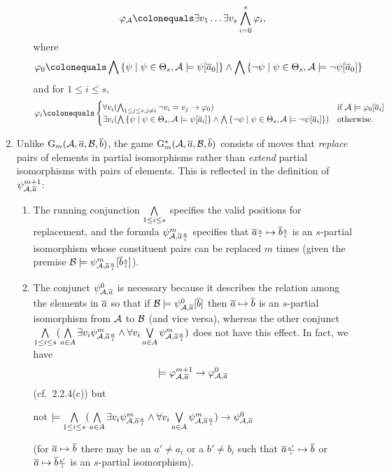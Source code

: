 \begin{enumerate}[1.]
\begin{enumerate}[(a)]
\[
\varphi_\strct{A} \defas \exists v_1 \etc \exists v_s \bland^s_{i = 0} \varphi_i,
\]
where
\[
\varphi_0 \defas \bland \setm{\psi}{\psi \in \Theta_s, \strct{A} \satis \psi[\vect{a}_0]} \land \bland \setm{\neg\psi}{\psi \in \Theta_s, \strct{A} \satis \neg\psi[\vect{a}_0]}
\]
and for $1 \leq i \leq s$,
\[
\varphi_i \defas
\begin{cases}
\forall v_i (\bland_{1 \leq j \leq s, j \neq i} \neg v_i = v_j \lthen \varphi_0) & \text{if \mathmode{\strct{A} \satis \varphi_0[\vect{a}_i]}}\cr
\exists v_i (\bland \setm{\psi}{\psi \in \Theta_s, \strct{A} \satis \psi[\vect{a}_i]} \land \bland \setm{\neg\psi}{\psi \in \Theta_s, \strct{A} \satis \neg\psi[\vect{a}_i]}) & \text{otherwise}.\cr
\end{cases}
\]
\end{enumerate}
%
\item {} Unlike $\game{m}(\strct{A}, \vect{a}, \strct{B}, \vect{b})$, the game $\game[s]{m}(\strct{A}, \vect{a}, \strct{B}, \vect{b})$ consists of moves that \emph{replace} pairs of elements in partial isomorphisms rather than \emph{extend} partial isomorphisms with pairs of elements. This is reflected in the definition of $\ityp{m + 1}{\strct{A}, \vect{a}}$:
\begin{enumerate}[(1)]
\item The running conjunction $\bigwedge\limits_{1 \leq i \leq s}$ specifies the valid positions for replacement, and the formula $\ityp{m}{\strct{A}, \vect{a}\sbst{a}{i}}$ specifies that $\overline{a}{\scriptstyle\frac{a}{i}} \mapsto \overline{b}{\scriptstyle\frac{b}{i}}$ is an $s$-partial isomorphism whose constituent pairs can be replaced $m$ times (given the premise $\strct{B} \satis \ityp{m}{\strct{A}, \vect{a}\sbst{a}{i}}[\vect{b}\sbst{b}{i}]$).
\item The conjunct $\ityp{0}{\strct{A}, \vect{a}}$ is necessary because it describes the relation among the elements in $\overline{a}$ so that if $\strct{B} \satis \ityp{0}{\strct{A}, \vect{a}}[\vect{b}]$ then $\overline{a} \mapsto \overline{b}$ is an $s$-partial isomorphism from $\mathcal{A}$ to $\mathcal{B}$ (and vice versa), whereas the other conjunct $\bland\limits_{1 \leq i \leq s}(\bland\limits_{a \in A} \exists v_i \ityp{m}{\strct{A}, \vect{a}\sbst{a}{i}} \land \forall v_i \blor\limits_{a \in A} \ityp{m}{\strct{A}, \vect{a}\sbst{a}{i}})$ does not have this effect. In fact, we have
\[
\models \varphi^{m + 1}_{\mathcal{A}, \overline{a}} \rightarrow \varphi^{0}_{\mathcal{A}, \overline{a}}
\]
(cf.\ 2.2.4(c)) but
\begin{center}
not $\consq \bland\limits_{1 \leq i \leq s}(\bland\limits_{a \in A} \exists v_i \ityp{m}{\strct{A}, \vect{a}\sbst{a}{i}} \land \forall v_i \blor\limits_{a \in A} \ityp{m}{\strct{A}, \vect{a}\sbst{a}{i}}) \lthen \ityp{0}{\strct{A}, \vect{a}}$
\end{center}
(for $\overline{a} \mapsto \overline{b}$ there may be an $a' \neq a_i$ or a $b' \neq b_i$ such that $\overline{a}{\scriptstyle\frac{a'}{i}} \mapsto \overline{b}$ or $\overline{a} \mapsto \overline{b}{\scriptstyle\frac{b'}{i}}$ is an $s$-partial isomorphism).


\end{enumerate}
\end{enumerate}
